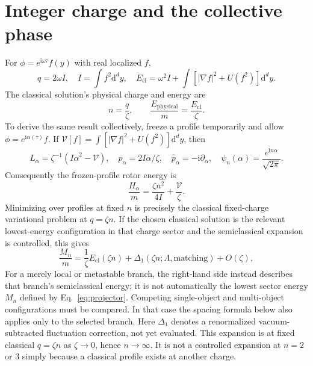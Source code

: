 \documentclass[11pt,a4paper]{article}
\newcommand{\dd}{\mathrm d}
\newcommand{\ii}{\mathrm i}
\begin{document}
\section{Integer charge and the collective phase}
For $\phi=e^{\ii\omega\tau}f(y)$ with real localized $f$,
\begin{equation}
 q=2\omega I,\quad I=\int f^2\dd^dy,\quad
 E_{\mathrm{cl}}=\omega^2I+\int[|\nabla f|^2+U(f^2)]\dd^dy.
\end{equation}
The classical solution's physical charge and energy are
\begin{equation}\label{eq:matching}
 n=\frac q\zeta,\qquad \frac{E_{\mathrm{physical}}}m=
 \frac{E_{\mathrm{cl}}}\zeta.
\end{equation}
To derive the same result collectively, freeze a profile temporarily and
allow $\phi=e^{\ii\alpha(\tau)}f$. If
$\mathcal V[f]=\int[|\nabla f|^2+U(f^2)]\dd^dy$, then
\begin{equation}
 L_\alpha=\zeta^{-1}(I\dot\alpha^2-\mathcal V),\quad
 p_\alpha=2I\dot\alpha/\zeta,\quad
 \hat p_\alpha=-\ii\partial_\alpha,\quad
 \psi_n(\alpha)=\frac{e^{\ii n\alpha}}{\sqrt{2\pi}}.
\end{equation}
Consequently the frozen-profile rotor energy is
\begin{equation}
 \frac{H_\alpha}m=\frac{\zeta n^2}{4I}+\frac{\mathcal V}\zeta.
\end{equation}
Minimizing over profiles at fixed $n$ is precisely the classical fixed-charge
variational problem at $q=\zeta n$. If the chosen classical solution is the
relevant lowest-energy configuration in that charge sector and the
semiclassical expansion is controlled, this gives
\begin{equation}\label{eq:mass}
 \frac{M_n}m=\frac1\zeta E_{\mathrm{cl}}(\zeta n)
 +\Delta_1(\zeta n;\Lambda,\text{matching})+O(\zeta),
\end{equation}
For a merely local or metastable branch, the right-hand side instead
describes that branch's semiclassical energy; it is not automatically the
lowest sector energy $M_n$ defined by Eq.~\eqref{eq:projector}. Competing
single-object and multi-object configurations must be compared. In that
case the spacing formula below also applies only to the selected branch.
Here $\Delta_1$ denotes a renormalized vacuum-subtracted fluctuation
correction, not yet evaluated. This expansion is at fixed classical
$q=\zeta n$ as $\zeta\to0$, hence $n\to\infty$.
It is not a controlled expansion at $n=2$ or $3$ simply because a classical
profile exists at another charge.
\end{document}
